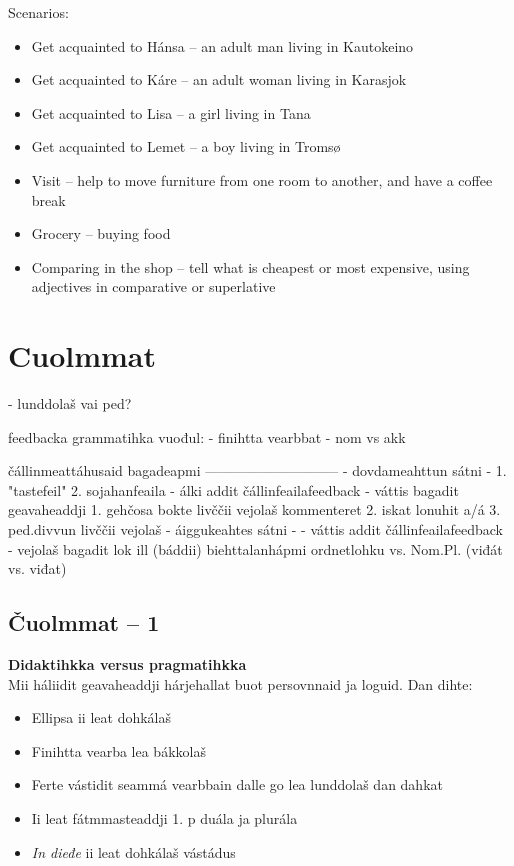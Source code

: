 \documentclass[a4paper,14pt]{article}
\begin{document}
Scenarios:
\begin{itemize}
\item Get acquainted to Hánsa -- an adult man living in Kautokeino
\item Get acquainted to Káre -- an adult woman living in Karasjok
\item Get acquainted to Lisa -- a girl living in Tana
\item Get acquainted to Lemet -- a boy living in Tromsø
\item Visit -- help to move furniture from one room to another, and have a coffee break
\item Grocery -- buying food
\item Comparing in the shop -- tell what is cheapest or most expensive, using adjectives in comparative or superlative
\end{itemize}


\section{Cuolmmat}
- lunddolaš vai ped?

feedbacka grammatihka vuođul:
- finihtta vearbbat
- nom vs akk

čállinmeattáhusaid bagadeapmi
-----------------------------
- dovdameahttun sátni -
	1. "tastefeil" 
	2. sojahanfeaila
	- álki addit čállinfeailafeedback
	- váttis bagadit geavaheaddji 
		1. gehčosa bokte livččii vejolaš kommenteret
		2. iskat lonuhit a/á 
		3. ped.divvun livččii vejolaš
- áiggukeahtes sátni -
	- váttis addit čállinfeailafeedback
	- vejolaš bagadit
	lok
	ill (báddii)
	biehttalanhápmi
	ordnetlohku vs. Nom.Pl. (viđát vs. viđat)







\subsection{Čuolmmat -- 1}
\textbf{Didaktihkka versus pragmatihkka} \\
Mii háliidit geavaheaddji hárjehallat buot persovnnaid ja loguid. Dan dihte:
\begin{itemize}
\item{Ellipsa ii leat dohkálaš}
\item{Finihtta vearba lea bákkolaš}
\item{Ferte vástidit seammá vearbbain dalle go lea lunddolaš dan dahkat}
\item{Ii leat fátmmasteaddji 1. p duála ja plurála }
\item{\textit{In dieđe} ii leat dohkálaš vástádus}
\end{itemize}
\end{document}
